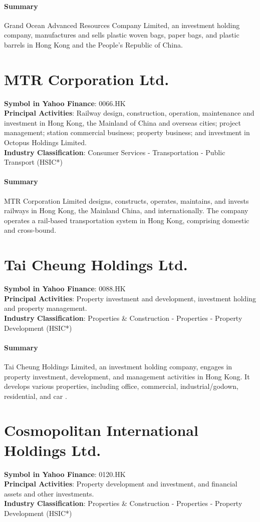 \paragraph{Summary}
Grand Ocean Advanced Resources Company Limited, an investment holding company, manufactures and sells plastic woven bags, paper bags, and plastic barrels in Hong Kong and the People's Republic of China.


\section{MTR Corporation Ltd.}
\textbf{Symbol in Yahoo Finance}: 0066.HK\\
\textbf{Principal Activities}: Railway design, construction, operation, maintenance and investment in Hong Kong, the Mainland of China and overseas cities; project management; station commercial business; property business; and investment in Octopus Holdings Limited.\\
\textbf{Industry Classification}: Consumer Services - Transportation - Public Transport (HSIC*)
\paragraph{Summary}
MTR Corporation Limited designs, constructs, operates, maintains, and invests railways in Hong Kong, the Mainland China, and internationally. The company operates a rail-based transportation system in Hong Kong, comprising domestic and cross-bound.


\section{Tai Cheung Holdings Ltd.}
\textbf{Symbol in Yahoo Finance}: 0088.HK\\
\textbf{Principal Activities}: Property investment and development, investment holding and property management.\\
\textbf{Industry Classification}: Properties \& Construction - Properties - Property Development (HSIC*)
\paragraph{Summary}
Tai Cheung Holdings Limited, an investment holding company, engages in property investment, development, and management activities in Hong Kong. It develops various properties, including office, commercial, industrial/godown, residential, and car .


\section{Cosmopolitan International Holdings Ltd.}
\textbf{Symbol in Yahoo Finance}: 0120.HK\\
\textbf{Principal Activities}: Property development and investment, and financial assets and other investments.\\
\textbf{Industry Classification}: Properties \& Construction - Properties - Property Development (HSIC*)
